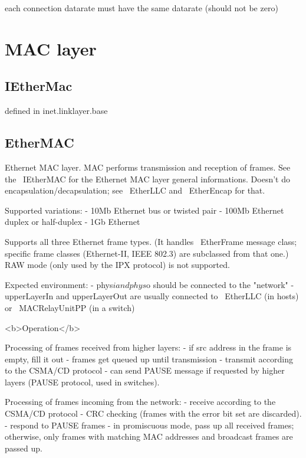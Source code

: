 each connection datarate must have the same datarate (should not be zero)


\section{MAC layer}

\subsection{IEtherMac}

defined in inet.linklayer.base

\subsection{EtherMAC}

Ethernet MAC layer. MAC performs transmission and reception of frames.
See the ~IEtherMAC for the Ethernet MAC layer general informations.
Doesn't do encapsulation/decapsulation; see ~EtherLLC and ~EtherEncap for
that.

Supported variations:
- 10Mb Ethernet bus or twisted pair
- 100Mb Ethernet duplex or half-duplex
- 1Gb Ethernet

Supports all three Ethernet frame types. (It handles ~EtherFrame message class;
specific frame classes (Ethernet-II, IEEE 802.3) are subclassed from that one.)
RAW mode (only used by the IPX protocol) is not supported.

Expected environment:
- phys$i and phys$o should be connected to the "network"
- upperLayerIn and upperLayerOut are usually connected to ~EtherLLC (in hosts)
  or ~MACRelayUnitPP (in a switch)

<b>Operation</b>

Processing of frames received from higher layers:
- if src address in the frame is empty, fill it out
- frames get queued up until transmission
- transmit according to the CSMA/CD protocol
- can send PAUSE message if requested by higher layers (PAUSE protocol,
  used in switches).

Processing of frames incoming from the network:
- receive according to the CSMA/CD protocol
- CRC checking (frames with the error bit set are discarded).
- respond to PAUSE frames
- in promiscuous mode, pass up all received frames;
  otherwise, only frames with matching MAC addresses and
  broadcast frames are passed up.

